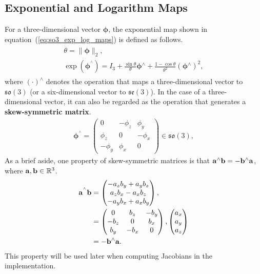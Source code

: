 \subsection{Exponential and Logarithm Maps}

For a three-dimensional vector $\boldsymbol{\phi}$, the exponential map shown in equation~(\ref{eq:so3_exp_log_maps}) is defined as follows.
%
\begin{align}
  \begin{gathered}
    \theta = \| \boldsymbol \phi \|_{2}, \\
    \exp \left( \boldsymbol \phi^{^\wedge} \right)
    =
    I_{3} +
    \frac{ \sin \theta }{ \theta } \boldsymbol \phi{^\wedge} +
    \frac{ 1 - \cos \theta }{ \theta^{2} } \left( \boldsymbol \phi{^\wedge} \right)^{2},
  \end{gathered}
  \label{eq:so3_exp_map}
\end{align}
%
where $\left( \cdot \right)^{\wedge}$ denotes the operation that maps a three-dimensional vector to $\mathfrak{so}(3)$ (or a six-dimensional vector to $\mathfrak{se}(3)$).
In the case of a three-dimensional vector, it can also be regarded as the operation that generates a {\bf skew-symmetric matrix}.
%
\begin{align}
  \boldsymbol \phi^{^\wedge}
%
  = \left( \begin{matrix}
      0         & -\phi_{z} & \phi_{y} \\
      \phi_{z}  & 0         & -\phi_{x} \\
      -\phi_{y} & \phi_{x}  & 0
    \end{matrix} \right) \in \mathfrak{so}(3),
  \label{eq:skew_symmetric_matrix}
\end{align}
%
As a brief aside, one property of skew-symmetric matrices is that ${\bf a}^{\wedge} {\bf b} = -{\bf b}^{\wedge} {\bf a}$, where ${\bf a}, {\bf b} \in \mathbb{R}^{3}$.
%
\begin{align}
  \begin{split}
    {\bf a}^{^\wedge} {\bf b}
%
    & = \left( \begin{matrix}
          -a_{z} b_{y} + a_{y} b_{z} \\
           a_{z} b_{x} - a_{x} b_{z} \\
          -a_{y} b_{x} + a_{x} b_{y}
        \end{matrix} \right), \\
%
    & = \left( \begin{matrix}
          0      &  b_{z} & -b_{y} \\
          -b_{z} & 0      & b_{x} \\
          b_{y}  & -b_{x} & 0
        \end{matrix} \right),
        \left( \begin{matrix}
          a_{x} \\
          a_{y} \\
          a_{z}
        \end{matrix} \right) \\
%
     & = -{\bf b}^{\wedge} {\bf a}.
  \end{split}
\end{align}
%
This property will be used later when computing Jacobians in the implementation.

